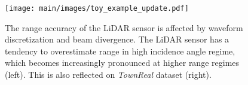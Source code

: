 \begin{figure}[t]
\centering
\texttt{[image: main/images/toy\_example\_update.pdf]}
\caption{The range accuracy of the LiDAR sensor is affected by waveform discretization and beam divergence. %
The LiDAR sensor has a tendency to overestimate range in high incidence angle regime, which becomes increasingly pronounced at higher range regimes (left). This is also reflected on \textit{TownReal} dataset (right).}
\label{fig:toy_example}
\end{figure}